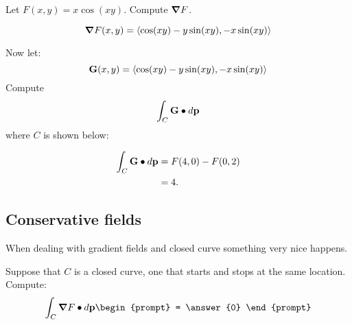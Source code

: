 \documentclass{ximera}
\begin{document}
\begin{question}
  Let $F(x,y) = x\cos(xy)$. Compute $\boldsymbol\nabla F$.
  \begin{prompt}
  \[
  \boldsymbol\nabla F(x,y) = \left\langle \cos(xy) -y\sin(xy), -x\sin(xy)\right\rangle
  \]
  \end{prompt}
  \begin{question}
    Now let:
    \[
    \mathbf{G}(x,y) = \left\langle \cos(xy) -y\sin(xy), -x\sin(xy)\right\rangle
    \]
    Compute
    \[
    \int_C \mathbf G \bullet \mathop{}\!d \mathbf{p}
    \]
    where $C$ is shown below:
    \begin{image}
      \end{image}
      \begin{prompt}
        \begin{align*}
          \int_C \mathbf{G}\bullet \mathop{}\!d \mathbf{p} &= F(4,0) - F(0,2)\\
          &= 4.
        \end{align*}
      \end{prompt}
  \end{question}
\end{question}


\subsection{Conservative fields}

When dealing with gradient fields and closed curve something very nice
happens.


\begin{question}
  Suppose that $C$ is a closed curve, one that starts and stops at the
  same location. Compute:
  \[
  \int_C \grad F\dotp \d \vec{p}
  \begin{prompt}
    = \answer{0}
  \end{prompt}
  \]
\end{question}
\end{document}
